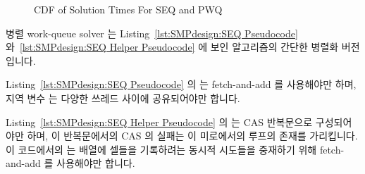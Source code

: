 \begin{figure}[tb]
\centering
{}
\caption{CDF of Solution Times For SEQ and PWQ}
\label{fig:SMPdesign:CDF of Solution Times For SEQ and PWQ}
\end{figure}

병렬 work-queue solver 는
Listing~\ref{lst:SMPdesign:SEQ Pseudocode}
와~\ref{lst:SMPdesign:SEQ Helper Pseudocode} 에 보인 알고리즘의 간단한 병렬화
버전입니다.
\begin{fcvref}
Listing~\ref{lst:SMPdesign:SEQ Pseudocode} 의
 는 fetch-and-add 를 사용해야만 하며, 지역 변수  는 다양한
쓰레드 사이에 공유되어야만 합니다.
\end{fcvref}
\begin{fcvref}
Listing~\ref{lst:SMPdesign:SEQ Helper Pseudocode} 의
 는 CAS 반복문으로 구성되어야만 하며, 이
반복문에서의 CAS 의 실패는 이 미로에서의 루프의 존재를 가리킵니다.
이 코드에서의  는  배열에
셀들을 기록하려는 동시적 시도들을 중재하기 위해 fetch-and-add 를 사용해야만
합니다.
\end{fcvref}

\iffalse

